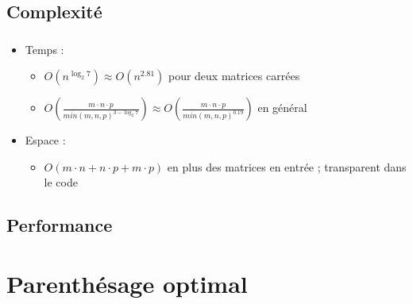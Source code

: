\documentclass{beamer}
\begin{document}
\subsection{Complexité}
\begin{frame}
  \frametitle{\insertsubsection}
  \begin{itemize}
    \item Temps :
    \begin{itemize}
      \item $O(n^{\log_2 7})\approx O(n^{2.81})$
      pour deux matrices carrées
      \item $O(\frac{m\cdot n\cdot p}{min(m,n,p)^{3-\log_2 7}})\approx
      O(\frac{m\cdot n\cdot p}{min(m,n,p)^{0.19}})$
      en général
    \end{itemize}
    \item Espace :
    \begin{itemize}
      \item $O(m\cdot n+n\cdot p+m\cdot p)$ en plus des matrices en entrée ;
      transparent dans le code
    \end{itemize}
  \end{itemize}
\end{frame}

\subsection{Performance}
\begin{frame}
  \frametitle{\insertsubsection}
\end{frame}


\section{Parenthésage optimal}
\end{document}
